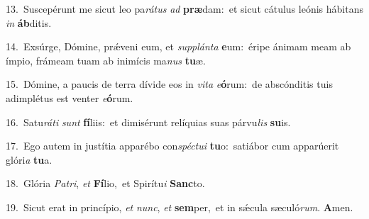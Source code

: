 {\numbfont\textcolor{\numbcolor}{13.}}~Suscepérunt me sicut leo pa\-\textit{rá}\-\textit{tus} \textit{ad} \textbf{præ}\-dam:~\star et sicut cátulus leónis hábitans \textit{in} \textbf{áb}\-ditis.\par
{\numbfont\textcolor{\numbcolor}{14.}}~Exsúrge, Dómine, prǽveni eum, et \textit{sup}\-\textit{plán}\textit{ta} \textbf{e}\-um:~\star éripe ánimam meam ab ímpio, frámeam tuam ab inimícis ma\textit{nus} \textbf{tu}\-æ.\par
{\numbfont\textcolor{\numbcolor}{15.}}~Dómine, a paucis de terra dívide eos in \textit{vi}\-\textit{ta} \textit{e}\-\textbf{ó}rum:~\star de abscónditis tuis adimplétus est venter \textit{e}\-\textbf{ó}rum.\par
{\numbfont\textcolor{\numbcolor}{16.}}~Satu\-\textit{rá}\-\textit{ti} \textit{sunt} \textbf{fí}\-liis:~\star et dimisérunt relíquias suas párvu\textit{lis} \textbf{su}\-is.\par
{\numbfont\textcolor{\numbcolor}{17.}}~Ego autem in justítia apparébo con\-\textit{spéc}\-\textit{tu}\textit{i} \textbf{tu}\-o:~\star satiábor cum apparúerit glóri\textit{a} \textbf{tu}\-a.\par
{\numbfont\textcolor{\numbcolor}{18.}}~Glória \textit{Pa}\-\textit{tri}, \textit{et} \textbf{Fí}\-lio,~\star et Spirítu\textit{i} \textbf{Sanc}\-to.\par
{\numbfont\textcolor{\numbcolor}{19.}}~Sicut erat in princípio, \textit{et} \textit{nunc}\-, \textit{et} \textbf{sem}\-per,~\star et in sǽcula sæculó\-\textit{rum}\-. \textbf{A}\-men.\par
